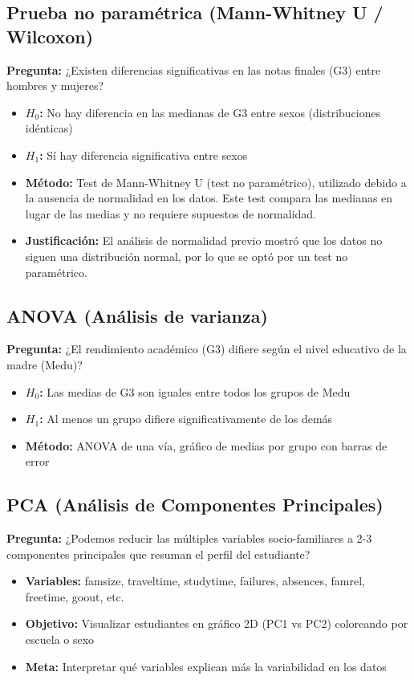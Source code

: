 \documentclass[a4paper,12pt]{article}
\begin{document}
\subsection{Prueba no paramétrica (Mann-Whitney U / Wilcoxon)}
\textbf{Pregunta:} ¿Existen diferencias significativas en las notas finales (G3) entre hombres y mujeres?

\begin{itemize}
    \item \textbf{$H_0$:} No hay diferencia en las medianas de G3 entre sexos (distribuciones idénticas)
    \item \textbf{$H_1$:} Sí hay diferencia significativa entre sexos
    \item \textbf{Método:} Test de Mann-Whitney U (test no paramétrico), utilizado debido a la ausencia de normalidad en los datos. Este test compara las medianas en lugar de las medias y no requiere supuestos de normalidad.
    \item \textbf{Justificación:} El análisis de normalidad previo mostró que los datos no siguen una distribución normal, por lo que se optó por un test no paramétrico.
\end{itemize}

\subsection{ANOVA (Análisis de varianza)}
\textbf{Pregunta:} ¿El rendimiento académico (G3) difiere según el nivel educativo de la madre (Medu)?

\begin{itemize}
    \item \textbf{$H_0$:} Las medias de G3 son iguales entre todos los grupos de Medu
    \item \textbf{$H_1$:} Al menos un grupo difiere significativamente de los demás
    \item \textbf{Método:} ANOVA de una vía, gráfico de medias por grupo con barras de error
\end{itemize}

\subsection{PCA (Análisis de Componentes Principales)}
\textbf{Pregunta:} ¿Podemos reducir las múltiples variables socio-familiares a 2-3 componentes principales que resuman el perfil del estudiante?

\begin{itemize}
    \item \textbf{Variables:} famsize, traveltime, studytime, failures, absences, famrel, freetime, goout, etc.
    \item \textbf{Objetivo:} Visualizar estudiantes en gráfico 2D (PC1 vs PC2) coloreando por escuela o sexo
    \item \textbf{Meta:} Interpretar qué variables explican más la variabilidad en los datos
\end{itemize}
\end{document}
